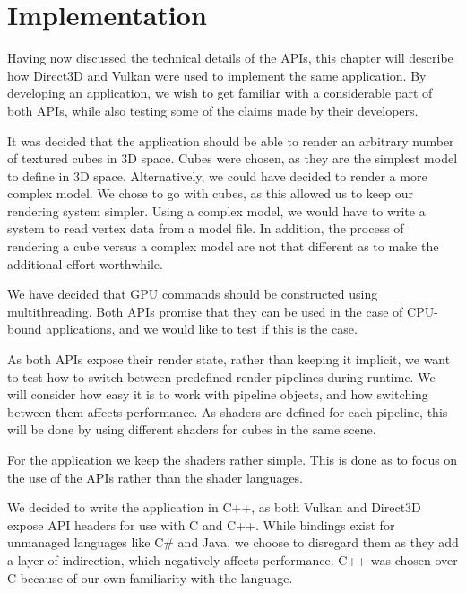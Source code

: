 \chapter{Implementation}\label{ch:implementation}
Having now discussed the technical details of the \glspl{API}, this chapter will describe how Direct3D and Vulkan were used to implement the same application. 
By developing an application, we wish to get familiar with a considerable part of both \glspl{API}, while also testing some of the claims made by their developers.


It was decided that the application should be able to render an arbitrary number of textured cubes in 3D space.
Cubes were chosen, as they are the simplest model to define in 3D space. 
Alternatively, we could have decided to render a more complex model.
We chose to go with cubes, as this allowed us to keep our rendering system simpler. 
Using a complex model, we would have to write a system to read vertex data from a model file. 
In addition, the process of rendering a cube versus a complex model are not that different as to make the additional effort worthwhile. 


We have decided that \gls{GPU} commands should be constructed using multithreading.
Both \glspl{API} promise that they can be used in the case of \gls{CPU}-bound applications, and we would like to test if this is the case. 

As both \glspl{API} expose their render state, rather than keeping it implicit, we want to test how to switch between predefined render pipelines during runtime. 
We will consider how easy it is to work with pipeline objects, and how switching between them affects performance.
As shaders are defined for each pipeline, this will be done by using different shaders for cubes in the same scene.

 
For the application we keep the shaders rather simple.
This is done as to focus on the use of the \glspl{API} rather than the shader languages.


We decided to write the application in C++, as both Vulkan and Direct3D expose \gls{API} headers for use with C and C++.
While bindings exist for unmanaged languages like C\# and Java, we choose to disregard them as they  add a layer of indirection, which negatively affects performance.
C++ was chosen over C because of our own familiarity with the language. 

